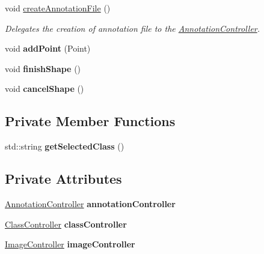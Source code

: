 \begin{DoxyCompactItemize}
\item 
\mbox{\label{classMainController_adcab0ecd57994728c1ad67dafc844179}} 
void \hyperlink{classMainController_adcab0ecd57994728c1ad67dafc844179}{create\+Annotation\+File} ()
\begin{DoxyCompactList}\small\item\em Delegates the creation of annotation file to the \hyperlink{classAnnotationController}{Annotation\+Controller}. \end{DoxyCompactList}\item 
\mbox{\label{classMainController_a319b25b145b9067d55d8b1967fb4b381}} 
void {\bfseries add\+Point} (Point)
\item 
\mbox{\label{classMainController_afa0ea947f033ff9fac5b798378d03667}} 
void {\bfseries finish\+Shape} ()
\item 
\mbox{\label{classMainController_a7855f2a07593bd632e36bed1452386b2}} 
void {\bfseries cancel\+Shape} ()
\end{DoxyCompactItemize}
\subsection*{Private Member Functions}
\begin{DoxyCompactItemize}
\item 
\mbox{\label{classMainController_ac2599267b4e51136efc57d7d0f1e3aa2}} 
std\+::string {\bfseries get\+Selected\+Class} ()
\end{DoxyCompactItemize}
\subsection*{Private Attributes}
\begin{DoxyCompactItemize}
\item 
\mbox{\label{classMainController_af065a8fdd42311f90d96b68f77f2248f}} 
\hyperlink{classAnnotationController}{Annotation\+Controller} {\bfseries annotation\+Controller}
\item 
\mbox{\label{classMainController_a5061629143625f07d1131a4ea8d39d73}} 
\hyperlink{classClassController}{Class\+Controller} {\bfseries class\+Controller}
\item 
\mbox{\label{classMainController_a6553221dd7d26251572bd730fdd9aae5}} 
\hyperlink{classImageController}{Image\+Controller} {\bfseries image\+Controller}
\end{DoxyCompactItemize}


